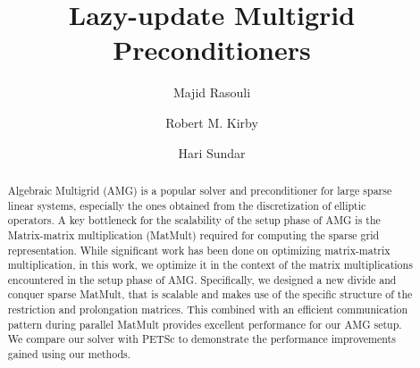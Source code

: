 \documentclass[runningheads]{llncs}
\begin{document}
%
\title{Lazy-update Multigrid Preconditioners}
%
%
\author{Majid Rasouli %
\and Robert M. Kirby %
\and Hari Sundar %
}
%
%
%
\maketitle              %
%
\begin{abstract}
Algebraic Multigrid (AMG) is a popular solver and preconditioner for large sparse linear systems, especially the ones obtained from the discretization of elliptic operators.
A key bottleneck for the scalability of the setup phase of AMG is the Matrix-matrix multiplication (MatMult) required for computing the sparse grid representation. While significant work has been done on optimizing matrix-matrix multiplication, in this work, we optimize it in the context of the matrix multiplications encountered in the setup phase of AMG. Specifically, we designed a new divide and conquer sparse MatMult, that is scalable and makes use of the specific structure of the restriction and prolongation matrices. This combined with an efficient communication pattern during parallel MatMult provides excellent performance for our AMG setup. We compare our solver with PETSc to demonstrate the performance improvements gained using our methods.

\end{abstract}
%







\end{document}
